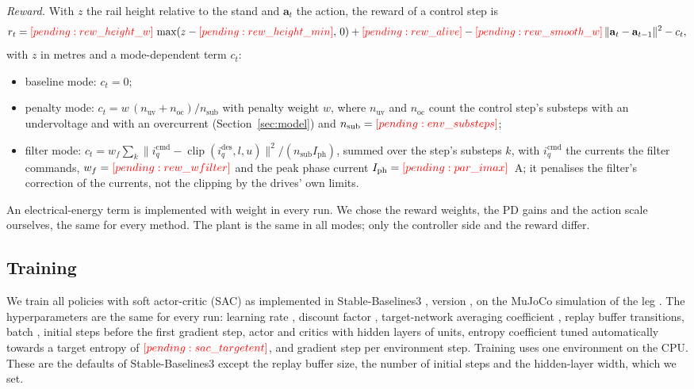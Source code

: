 \emph{Reward.} With $z$ the rail height relative to the stand and $\mathbf a_t$ the action, the reward of a control step is
\begin{equation}
r_t = \res{rew_height_w}\,\max(z-\res{rew_height_min},\,0) + \res{rew_alive} - \res{rew_smooth_w}\,\|\mathbf a_t-\mathbf a_{t-1}\|^2 - c_t ,
\label{eq:reward}
\end{equation}
with $z$ in metres and a mode-dependent term $c_t$:
\begin{itemize}
\item baseline mode: $c_t=0$;
\item penalty mode: $c_t = w\,(n_{\mathrm{uv}}+n_{\mathrm{oc}})/n_{\mathrm{sub}}$ with penalty weight $w$, where $n_{\mathrm{uv}}$ and $n_{\mathrm{oc}}$ count the control step's substeps with an undervoltage and with an overcurrent (Section~\ref{sec:model}) and $n_{\mathrm{sub}}=\res{env_substeps}$;
\item filter mode: $c_t = w_f \sum_k \|i_q^{\mathrm{cmd}}-\operatorname{clip}(i_q^{\mathrm{des}},l,u)\|^2/(n_{\mathrm{sub}} I_{\mathrm{ph}})$, summed over the step's substeps $k$, with $i_q^{\mathrm{cmd}}$ the currents the filter commands, $w_f=\res{rew_wfilter}$ and the peak phase current $I_{\mathrm{ph}}=\res{par_imax}$~A; it penalises the filter's correction of the currents, not the clipping by the drives' own limits.
\end{itemize}
An electrical-energy term is implemented with weight  in every run. We chose the reward weights, the PD gains and the action scale ourselves, the same for every method. The plant is the same in all modes; only the controller side and the reward differ.

\subsection{Training}
We train all policies with soft actor-critic (SAC) \cite{haarnoja2018sac} as implemented in Stable-Baselines3 \cite{raffin2021sb3}, version , on the MuJoCo simulation of the leg \cite{todorov2012mujoco}. The hyperparameters are the same for every run: learning rate , discount factor , target-network averaging coefficient , replay buffer  transitions, batch ,  initial steps before the first gradient step, actor and critics with  hidden layers of  units, entropy coefficient tuned automatically towards a target entropy of $\res{sac_targetent}$, and  gradient step per environment step. Training uses one environment on the CPU. These are the defaults of Stable-Baselines3 except the replay buffer size, the number of initial steps and the hidden-layer width, which we set.

